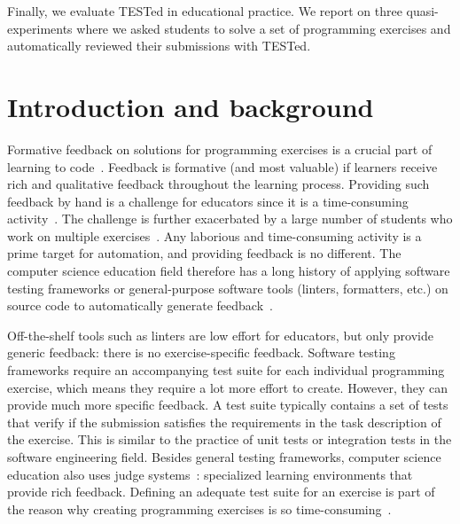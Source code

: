 \documentclass[../main]{subfiles}
\begin{document}
Finally, we evaluate TESTed in educational practice.
We report on three quasi-experiments where we asked students to solve a set of programming exercises and automatically reviewed their submissions with TESTed.

\section{Introduction and background}\label{sec:tested1-introduction-and-background}

Formative feedback on solutions for programming exercises is a crucial part of learning to code~\autocite{shuteFocusFormativeFeedback2008,orrellFeedbackLearningAchievement2006,luxton-reillyIntroductoryProgrammingSystematic2018}.
Feedback is formative (and most valuable) if learners receive rich and qualitative feedback throughout the learning process.
Providing such feedback by hand is a challenge for educators since it is a time-consuming activity~\autocite{camposMultinationalCaseStudy2012,cheangAutomatedGradingProgramming2003, keuningSystematicLiteratureReview2018,haoUnderstandingEffectiveDesign2021,zavalaUseSemanticbasedAIG2018,staubitzRepositoryOpenAutogradable2017,pirttinenCrowdsourcingProgrammingAssignments2018,gulwaniFeedbackGenerationPerformance2014,tangDatadrivenTestCase2016,edwardsDevelopingCommonFormat2008a}.
The challenge is further exacerbated by a large number of students who work on multiple exercises~\autocite{campGenerationCSGrowth2017,saxExaminingEnrollmentGrowth2017}.
Any laborious and time-consuming activity is a prime target for automation, and providing feedback is no different.
The computer science education field therefore has a long history of applying software testing frameworks or general-purpose software tools (linters, formatters, etc.) on source code to automatically generate feedback~\autocite{haoUnderstandingEffectiveDesign2021,edwardsUsingSoftwareTesting2004,paivaAutomatedAssessmentComputer2022,keuningSystematicLiteratureReview2018}.

Off-the-shelf tools such as linters are low effort for educators, but only provide generic feedback: there is no exercise-specific feedback.
Software testing frameworks require an accompanying test suite for each individual programming exercise, which means they require a lot more effort to create.
However, they can provide much more specific feedback.
A test suite typically contains a set of tests that verify if the submission satisfies the requirements in the task description of the exercise.
This is similar to the practice of unit tests or integration tests in the software engineering field.
Besides general testing frameworks, computer science education also uses judge systems~\autocite{paivaAutomatedAssessmentComputer2022,wasikSurveyOnlineJudge2018}: specialized learning environments that provide rich feedback.
Defining an adequate test suite for an exercise is part of the reason why creating programming exercises is so time-consuming~\autocite{zavalaUseSemanticbasedAIG2018,staubitzRepositoryOpenAutogradable2017,queirosPexilProgrammingExercises2011,pirttinenCrowdsourcingProgrammingAssignments2018,gulwaniFeedbackGenerationPerformance2014,tangDatadrivenTestCase2016}.
\end{document}
